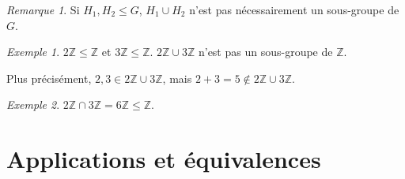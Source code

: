 \documentclass{report}
\newcommand*{\entiers}{\mathbb{Z}}
\theoremstyle{definition}
\theoremstyle{remark}
\newtheorem*{exem}{Exemple}
\newtheorem*{rema}{Remarque}
\begin{document}
	\begin{rema}
		Si $H_1,H_2 \leq G$, $H_1 \cup H_2$ n'est pas n\'ecessairement un sous-groupe de $G$.
		\begin{exem}
			$2\entiers \leq \entiers$ et $3\entiers \leq \entiers$. $2\entiers \cup 3\entiers$ n'est pas un sous-groupe de $\entiers$.

			Plus pr\'ecis\'ement, $2,3 \in 2\entiers \cup 3\entiers$, mais $2+3=5 \not\in 2\entiers \cup 3\entiers$.
		\end{exem}
	\end{rema}
	\begin{exem}
		$2\entiers \cap 3\entiers = 6\entiers \leq \entiers$.
	\end{exem}

	\setcounter{chapter}{1}
	\chapter{Applications et \'equivalences}
	\setcounter{section}{3}
\end{document}
